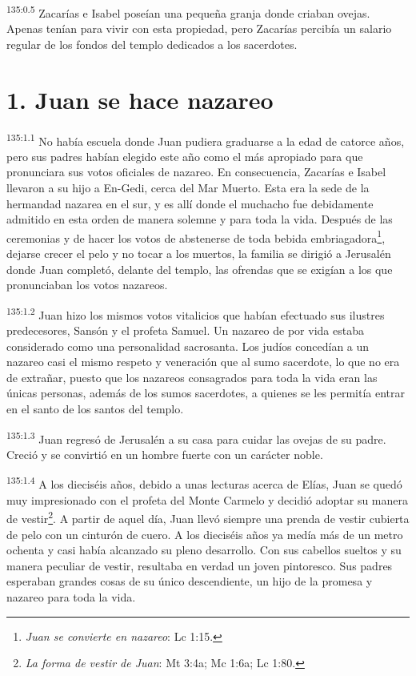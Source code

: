 \par 
\textsuperscript{135:0.5} Zacarías e Isabel poseían una pequeña granja donde criaban ovejas. Apenas tenían para vivir con esta propiedad, pero Zacarías percibía un salario regular de los fondos del templo dedicados a los sacerdotes.

\section*{1. Juan se hace nazareo}
\par 
\textsuperscript{135:1.1} No había escuela donde Juan pudiera graduarse a la edad de catorce años, pero sus padres habían elegido este año como el más apropiado para que pronunciara sus votos oficiales de nazareo. En consecuencia, Zacarías e Isabel llevaron a su hijo a En-Gedi, cerca del Mar Muerto. Esta era la sede de la hermandad nazarea en el sur, y es allí donde el muchacho fue debidamente admitido en esta orden de manera solemne y para toda la vida. Después de las ceremonias y de hacer los votos de abstenerse de toda bebida embriagadora\footnote{\textit{Juan se convierte en nazareo}: Lc 1:15.}, dejarse crecer el pelo y no tocar a los muertos, la familia se dirigió a Jerusalén donde Juan completó, delante del templo, las ofrendas que se exigían a los que pronunciaban los votos nazareos.

\par 
\textsuperscript{135:1.2} Juan hizo los mismos votos vitalicios que habían efectuado sus ilustres predecesores, Sansón y el profeta Samuel. Un nazareo de por vida estaba considerado como una personalidad sacrosanta. Los judíos concedían a un nazareo casi el mismo respeto y veneración que al sumo sacerdote, lo que no era de extrañar, puesto que los nazareos consagrados para toda la vida eran las únicas personas, además de los sumos sacerdotes, a quienes se les permitía entrar en el santo de los santos del templo.

\par 
\textsuperscript{135:1.3} Juan regresó de Jerusalén a su casa para cuidar las ovejas de su padre. Creció y se convirtió en un hombre fuerte con un carácter noble.

\par 
\textsuperscript{135:1.4} A los dieciséis años, debido a unas lecturas acerca de Elías, Juan se quedó muy impresionado con el profeta del Monte Carmelo y decidió adoptar su manera de vestir\footnote{\textit{La forma de vestir de Juan}: Mt 3:4a; Mc 1:6a; Lc 1:80.}. A partir de aquel día, Juan llevó siempre una prenda de vestir cubierta de pelo con un cinturón de cuero. A los dieciséis años ya medía más de un metro ochenta y casi había alcanzado su pleno desarrollo. Con sus cabellos sueltos y su manera peculiar de vestir, resultaba en verdad un joven pintoresco. Sus padres esperaban grandes cosas de su único descendiente, un hijo de la promesa y nazareo para toda la vida.

